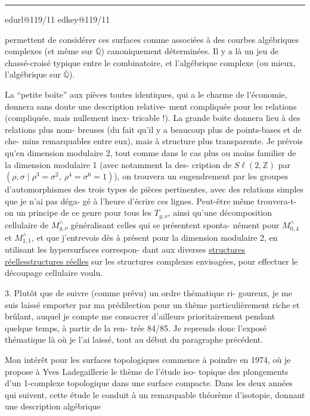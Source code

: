 \documentclass[11pt,a4paper]{article}
\makeatletter
\newif\ifreading
\newif\ifenglish
\def\CurrentScanURL{}
\def\CurrentPageKey{}
\def\CurrentApparatus{}
\newcommand{\scanpage}[1]{%
  \clearpage
  \expandafter\let\expandafter\CurrentScanURL\csname edurl@#1\endcsname
  \expandafter\let\expandafter\CurrentPageKey\csname edkey@#1\endcsname
  \def\CurrentApparatus{}%
  \hypertarget{scan-\CurrentPageKey}{}%
  \typeout{EDITION-SCAN: \CurrentPageKey; PDFPAGE: \the\numexpr\ReadonlyShipoutCounter+1\relax}%
  \ifreading
    \marginnote{\raggedright\scriptsize\sffamily\href{\CurrentScanURL}{119 / \csname edpage@#1\endcsname}}%
  \else
    \noindent{\small\sffamily\href{\CurrentScanURL}{[scan #1]}}\par\smallskip
  \fi}
\newcommand{\mspage}[1]{%
  \ifreading\marginnote{\raggedright\scriptsize\sffamily p.\,#1}[2\baselineskip]%
  \else\noindent{\small\sffamily[p.\,#1]}\par\smallskip\fi}
\let\TextUline\uline
\renewcommand{\uline}[1]{\ifmmode\underline{#1}\else\TextUline{#1}\fi}
\newcommand{\margin}[1]{%
  \sbox{\MarginalTestBox}{\parbox{\marginparwidth}{\raggedright\footnotesize#1}}%
  \ifdim\dimexpr\ht\MarginalTestBox+\dp\MarginalTestBox\relax>3\baselineskip
    \par\smallskip\noindent\begin{minipage}{\linewidth}\hrule\smallskip
    {\footnotesize\textcolor{HandInk}{\ifenglish Marginal note:\else Note marginale :\fi\ #1}}\smallskip\hrule\end{minipage}\par\smallskip
  \else
    \marginnote{\raggedright\footnotesize\textcolor{HandInk}{#1}}%
  \fi}
\newcommand{\finishscan}{\ifx\CurrentApparatus\empty\else\par\bigskip\noindent\rule{.35\linewidth}{.35pt}\par\smallskip{\footnotesize\setlength{\parskip}{3pt}\CurrentApparatus}\fi}
\makeatother
\begin{document}
\margin{10}

\finishscan
\scanpage{119/11}
\mspage{9}

permettent de considérer ces surfaces comme associées à des courbes
algébriques complexes (et même sur $\overline{\mathbb{Q}}$) canoniquement déterminées.
Il y a là un jeu de chassé-croisé typique entre le combinatoire,
et l'algébrique complexe (ou mieux, l'algébrique sur $\overline{\mathbb{Q}}$).

La ``petite boite'' aux pièces toutes identiques, qui a le
charme de l'économie, donnera sans doute une description relative-%
ment compliquée pour les relations (compliquée, mais nullement inex-%
tricable !). La grande boite donnera lieu à des relations plus nom-%
breuses (du fait qu'il y a beaucoup plus de points-bases et de che-%
mins remarquables entre eux), mais à structure plus transparente. Je
prévois qu'en dimension modulaire 2, tout comme dans le cas plus ou
moins familier de la dimension modulaire 1 (avec notamment la des-%
cription de $S\ell(2,\mathbb{Z})$ par $(\rho,\sigma \mid \rho^3 = \sigma^2,\ \rho^4 = \sigma^6 = 1)$), on trouvera
un engendrement par les groupes d'automorphismes des trois types de
pièces pertinentes, avec des relations simples que je n'ai pas déga-%
gé à l'heure d'écrire ces lignes. Peut-être même trouvera-t-on un
principe de ce genre pour tous les $T_{g,\nu}$, ainsi qu'une décomposition
cellulaire de $M^{\wedge}_{g,\nu}$ généralisant celles qui se présentent sponta-%
nément pour $M^{\wedge}_{0,4}$ et $M^{\wedge}_{1,1}$, et que j'entrevois dès à présent pour
la dimension modulaire 2, en utilisant les hypersurfaces correspon-%
dant aux diverses \uline{structures réelles} sur les structures complexes
envisagées, pour effectuer le découpage cellulaire voulu.


3. Plutôt que de suivre (comme prévu) un ordre thématique ri-%
goureux, je me suis laissé emporter par ma prédilection pour un thème
particulièrement riche et brûlant, auquel je compte me consacrer
d'ailleurs prioritairement pendant quelque temps, à partir de la ren-%
trée 84/85. Je reprends donc l'exposé thématique là où je l'ai laissé,
tout au début du paragraphe précédent.

Mon intérêt pour les surfaces topologiques commence à poindre
en 1974, où je propose à Yves Ladegaillerie le thème de l'étude iso-%
topique des plongements d'un 1-complexe topologique dans une surface
compacte. Dans les deux années qui suivent, cette étude le conduit à
un remarquable théorème d'isotopie, donnant une description algébrique
\end{document}
